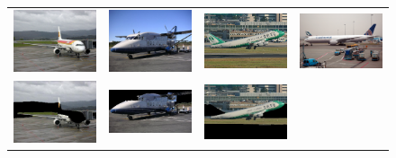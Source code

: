 \documentclass[10pt,twocolumn,letterpaper]{article}
\begin{document}
\begin{figure}[p]
\centering
\begin{tabular}{ p{4cm} p{4cm} p{4cm} p{4cm} }
\includegraphics[width=3.95cm]{figures/add_res/plane/2008_000804.jpg.eps} &
\includegraphics[width=3.95cm]{figures/add_res/plane/2008_001805.jpg.eps} &
\includegraphics[width=3.95cm]{figures/add_res/plane/2008_002358.jpg.eps} &
\includegraphics[width=3.95cm]{figures/add_res/plane/2008_003673.jpg.eps} \\
\includegraphics[width=3.95cm]{figures/add_res/plane/2008_000804.jpg_2_bad.jpg.eps} &
\includegraphics[width=3.95cm]{figures/add_res/plane/2008_001805.jpg_2_okay.jpg.eps} &
\includegraphics[width=3.95cm]{figures/add_res/plane/2008_002358.jpg_2_okay.jpg.eps} &

\end{tabular}
\end{figure}
\end{document}
